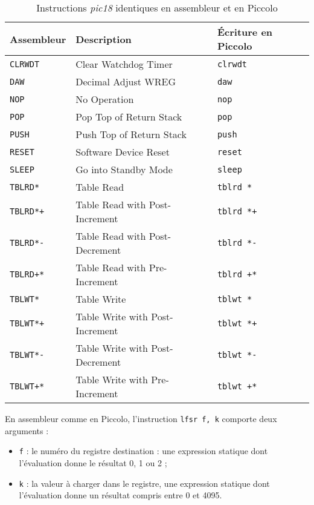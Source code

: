 \begin{table}[!ht]
  \centering
  \small
  \begin{tabular}{lll}
    \textbf{Assembleur} & \textbf{Description} & \textbf{Écriture en Piccolo}\\
    \hline
    \texttt{CLRWDT} & Clear Watchdog Timer & \texttt{clrwdt}\\
    \texttt{DAW} & Decimal Adjust WREG & \texttt{daw}\\
    \texttt{NOP} & No Operation & \texttt{nop}\\
    \texttt{POP} & Pop Top of Return Stack & \texttt{pop} \\
    \texttt{PUSH} & Push Top of Return Stack & \texttt{push}\\
    \texttt{RESET} & Software Device Reset & \texttt{reset} \\
    \texttt{SLEEP} & Go into Standby Mode & \texttt{sleep}\\
    \texttt{TBLRD*} & Table Read & \texttt{tblrd *} \\
    \texttt{TBLRD*+} & Table Read with Post-Increment & \texttt{tblrd *+} \\
    \texttt{TBLRD*-} & Table Read with Post-Decrement & \texttt{tblrd *-} \\
    \texttt{TBLRD+*} & Table Read with Pre-Increment & \texttt{tblrd +*} \\
    \texttt{TBLWT*} & Table Write & \texttt{tblwt *} \\
    \texttt{TBLWT*+} & Table Write with Post-Increment & \texttt{tblwt *+} \\
    \texttt{TBLWT*-} & Table Write with Post-Decrement & \texttt{tblwt *-} \\
    \texttt{TBLWT+*} & Table Write with Pre-Increment & \texttt{tblwt +*} \\
    \hline
  \end{tabular}
  \caption{Instructions \emph{pic18} identiques en assembleur et en Piccolo}
\end{table}



En assembleur comme en Piccolo, l'instruction \texttt{lfsr f, k} comporte deux arguments :
\begin{itemize}
  \item \texttt{f} : le numéro du registre destination : une expression statique dont l’évaluation donne le résultat 0, 1 ou 2 ;
  \item \texttt{k} : la valeur à charger dans le registre, une expression statique dont l’évaluation donne un résultat compris entre 0 et 4095.
\end{itemize}

